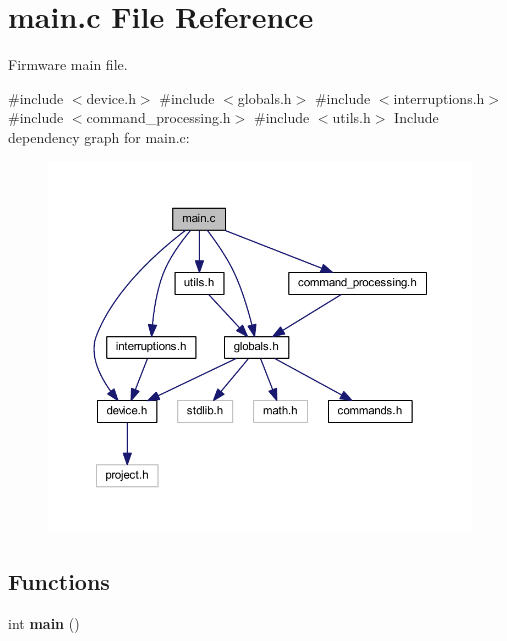 \section{main.\+c File Reference}
\label{main_8c}


Firmware main file.  


{\ttfamily \#include $<$device.\+h$>$}\newline
{\ttfamily \#include $<$globals.\+h$>$}\newline
{\ttfamily \#include $<$interruptions.\+h$>$}\newline
{\ttfamily \#include $<$command\+\_\+processing.\+h$>$}\newline
{\ttfamily \#include $<$utils.\+h$>$}\newline
Include dependency graph for main.\+c\+:\nopagebreak
\begin{figure}[H]
\begin{center}
\leavevmode
\includegraphics[width=350pt]{main_8c__incl}
\end{center}
\end{figure}
\subsection*{Functions}
\begin{DoxyCompactItemize}
\item 
\mbox{\label{main_8c_ae66f6b31b5ad750f1fe042a706a4e3d4}} 
int {\bfseries main} ()
\end{DoxyCompactItemize}


